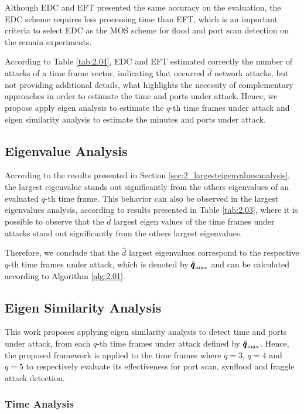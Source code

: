 Although EDC and EFT presented the same accuracy on the evaluation, the EDC scheme requires less processing time than EFT, which is an important criteria to select EDC as the MOS scheme for flood and port scan detection on the remain experiments.

According to Table \ref{tab:2.04}, EDC and EFT estimated correctly the number of attacks of a time frame vector, indicating that occurred $\hat{d}$ network attacks, but not providing additional details, what highlights the necessity of complementary approaches in order to estimate the time and ports under attack. Hence, we propose apply eigen analysis to estimate the $q$-th time frames under attack and eigen similarity analysis to estimate the minutes and ports under attack.

\subsection{Eigenvalue Analysis}
\label{sec:2_EigenvalueAnalysis}

According to the results presented in Section \ref{sec:2_largesteigenvaluesanalysis}, the largest eigenvalue stands out significantly from the others eigenvalues of an evaluated $q$-th time frame. This behavior can also be observed in the largest eigenvalues analysis, according to results presented in Table \ref{tab:2.03}, where it is possible to observe that the $\hat{d}$ largest eigen values of the time frames under attacks stand out significantly from the others largest eigenvalues. 

Therefore, we conclude that the $\hat{d}$ largest eigenvalues correspond to the respective $q$-th time frames under attack, which is denoted by $\rm{\hat{\pmb{q}}}_{\rm max}$ and can be calculated according to Algorithm \ref{alg:2.01}.

\subsection{Eigen Similarity Analysis}
\label{sec:2_EigenSimilarityAnalysis}

This work proposes applying eigen similarity analysis to detect time and ports under attack, from each $q$-th time frames under attack defined by $\rm{\hat{\pmb{q}}}_{\rm max}$. Hence, the proposed framework is applied to the time frames where $q=3$, $q=4$ and $q=5$ to respectively evaluate its effectiveness for port scan, synflood and fraggle attack detection.

\subsubsection{Time Analysis}
\label{sec:2_TimeAnalysis}

